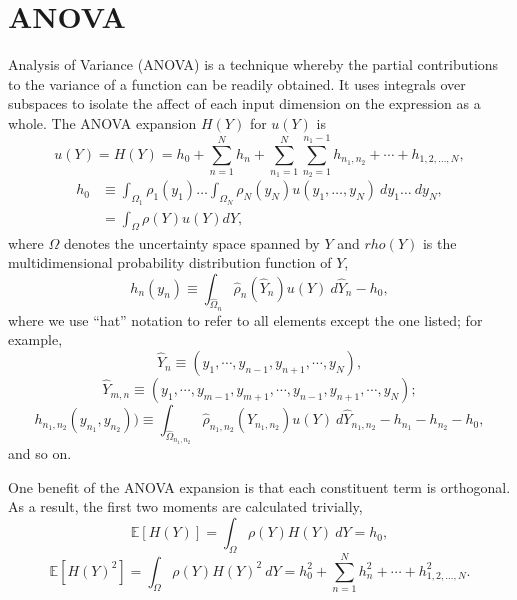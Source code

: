 \documentclass[11pt]{article}
\newcommand{\expv}[1]{\ensuremath{\mathbb{E}[ #1]}}
\begin{document}
\section{ANOVA}
Analysis of Variance (ANOVA) is a technique whereby the partial contributions to the variance of a function
can be readily obtained.  It uses integrals over subspaces to isolate the affect of each input dimension on
the expression as a whole.  The ANOVA expansion $H(Y)$ for $u(Y)$ is
\begin{equation}
  u(Y) = H(Y) = h_0 + \sum_{n=1}^N h_n + \sum_{n_1=1}^N \sum_{n_2=1}^{n_1-1} h_{n_1,n_2} + \cdots +
  h_{1,2,\ldots,N},
\end{equation}
\begin{align}
  h_0 &\equiv \int_{\Omega_1} \rho_1(y_1)\ldots\int_{\Omega_N} \rho_N(y_N) u(y_1,\ldots,y_N)\ dy_1\ldots\ dy_N, \\
    &= \int_\Omega \rho(Y) u(Y) dY,
\end{align}
where $\Omega$ denotes the uncertainty space spanned by $Y$ and $rho(Y)$ is the multidimensional probability distribution
function of $Y$,
\begin{equation}
  h_n(y_n) \equiv \int_{\hat\Omega_n} \hat\rho_n(\hat Y_n) u(Y)\ d\hat Y_n - h_0,
\end{equation}
where we use ``hat'' notation to refer to all elements except the one listed; for example,
\begin{equation}
  \hat Y_n \equiv (y_1,\cdots,y_{n-1},y_{n+1},\cdots,y_N),
\end{equation}
\begin{equation}
  \hat Y_{m,n} \equiv (y_1,\cdots,y_{m-1},y_{m+1},\cdots,y_{n-1},y_{n+1},\cdots,y_N);
\end{equation}
\begin{equation}
  h_{n_1,n_2}(y_{n_1},y_{n_2})) \equiv \int_{\hat\Omega_{n_1,n_2}} \hat\rho_{n_1,n_2}(\hat Y_{n_1,n_2}) u(Y)\
      d\hat Y_{n_1,n_2} - h_{n_1} - h_{n_2} - h_0,
\end{equation}
and so on.

One benefit of the ANOVA expansion is that each constituent term is orthogonal.  As a result, the first two
moments are calculated trivially,
\begin{equation}
  \expv{H(Y)} = \int_\Omega \rho(Y) H(Y)\ dY = h_0,
\end{equation}
\begin{equation}
  \expv{H(Y)^2} = \int_\Omega \rho(Y) H(Y)^2\ dY = h_0^2 + \sum_{n=1}^N h_n^2 + \cdots + h_{1,2,\ldots,N}^2.
\end{equation}
\end{document}
